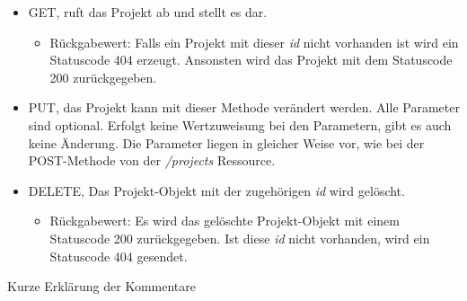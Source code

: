 \documentclass[12pt]{scrartcl}
\begin{document}
\begin{itemize}
		\begin{itemize}
			\item GET, ruft das Projekt ab und stellt es dar. 
			\begin{itemize}
				\item Rückgabewert: Falls ein Projekt mit dieser \emph{id} nicht vorhanden ist wird ein Statuscode 404 erzeugt. Ansonsten wird das Projekt mit dem Statuscode 200 zurückgegeben.
			\end{itemize}
			\item PUT, das Projekt kann mit dieser Methode verändert werden. Alle Parameter sind optional. Erfolgt keine Wertzuweisung bei den Parametern, gibt es auch keine Änderung. Die Parameter liegen in gleicher Weise vor, wie bei der POST-Methode von der \emph{/projects} Ressource.
			\item DELETE, Das Projekt-Objekt mit der zugehörigen \emph{id} wird gelöscht.
			\begin{itemize}
				\item Rückgabewert: Es wird das gelöschte Projekt-Objekt mit einem Statuscode 200 zurückgegeben. Ist diese \emph{id} nicht vorhanden, wird ein Statuscode 404 gesendet.
			\end{itemize}
			
		\end{itemize}
		
\end{itemize}
Kurze Erklärung der Kommentare
\end{document}
